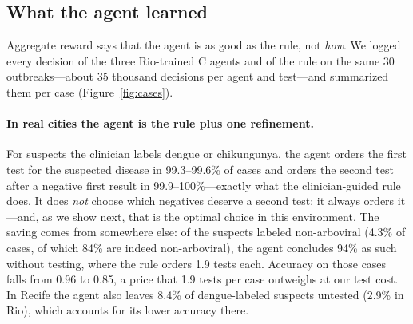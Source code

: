 \documentclass[11pt,a4paper]{article}
\begin{document}
\subsection{What the agent learned}
\label{sec:res_cases}

Aggregate reward says that the agent is as good as the rule, not \emph{how}. We logged every decision of the three Rio-trained C agents and of the rule on the same 30 outbreaks---about 35 thousand decisions per agent and test---and summarized them per case (Figure~\ref{fig:cases}).

\paragraph{In real cities the agent is the rule plus one refinement.} For suspects the clinician labels dengue or chikungunya, the agent orders the first test for the suspected disease in 99.3--99.6\% of cases and orders the second test after a negative first result in 99.9--100\%---exactly what the clinician-guided rule does. It does \emph{not} choose which negatives deserve a second test; it always orders it---and, as we show next, that is the optimal choice in this environment. The saving comes from somewhere else: of the suspects labeled non-arboviral (4.3\% of cases, of which 84\% are indeed non-arboviral), the agent concludes 94\% as such without testing, where the rule orders 1.9 tests each. Accuracy on those cases falls from 0.96 to 0.85, a price that 1.9 tests per case outweighs at our test cost. In Recife the agent also leaves 8.4\% of dengue-labeled suspects untested (2.9\% in Rio), which accounts for its lower accuracy there.
\end{document}
